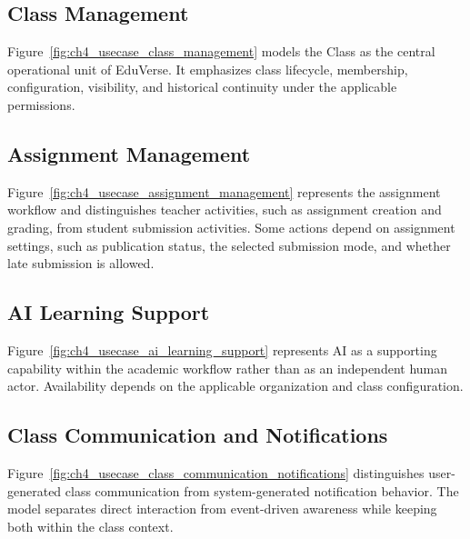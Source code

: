 \begin{samepage}
\subsection*{Class Management}

Figure~\ref{fig:ch4_usecase_class_management} models the Class as the central
operational unit of EduVerse. It emphasizes class lifecycle, membership,
configuration, visibility, and historical continuity under the applicable
permissions.
\end{samepage}

\begin{samepage}
\subsection*{Assignment Management}

Figure~\ref{fig:ch4_usecase_assignment_management} represents the assignment workflow and distinguishes teacher activities, such as assignment creation and grading, from student submission activities. Some actions depend on assignment settings, such as publication status, the selected submission mode, and whether late submission is allowed.
\end{samepage}

\begin{samepage}
\subsection*{AI Learning Support}

Figure~\ref{fig:ch4_usecase_ai_learning_support} represents AI as a supporting
capability within the academic workflow rather than as an independent human
actor. Availability depends on the applicable organization and class
configuration.
\end{samepage}

\begin{samepage}
\subsection*{Class Communication and Notifications}

Figure~\ref{fig:ch4_usecase_class_communication_notifications} distinguishes
user-generated class communication from system-generated notification
behavior. The model separates direct interaction from event-driven awareness
while keeping both within the class context.
\end{samepage}

